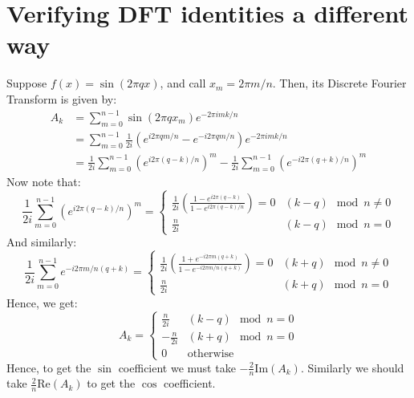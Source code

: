 \documentclass[reqno]{article}
\begin{document}
\section{Verifying DFT identities a different way}
Suppose $f(x) = \sin(2\pi q x)$, and call $x_m = 2\pi m / n$.
Then, its Discrete Fourier Transform is given by:
\begin{equation}
    \begin{split}
        A_k
        &=
        \sum_{m = 0}^{n - 1}
        \sin(2\pi q x_m)
        e^{-2\pi i mk / n} \\
        &=
        \sum_{m = 0}^{n - 1}
        \frac{1}{2i} \left( e^{i 2\pi q m / n} - e^{-i 2\pi q m / n} \right)
        e^{-2\pi i mk / n} \\
        &=
        \frac{1}{2i} \sum_{m = 0}^{n - 1}
        \left( e^{i 2\pi (q - k)/n} \right)^m
        -
        \frac{1}{2i} \sum_{m = 0}^{n - 1}
        \left( e^{-i 2\pi (q + k)/ n} \right)^m
    \end{split}
\end{equation}
Now note that:
\begin{equation}
    \frac{1}{2i} \sum_{m = 0}^{n - 1}
    \left( e^{i 2\pi (q - k)/ n}\right)^m
    =
    \begin{cases}
        \frac{1}{2i} \left(\frac{1 - e^{i 2\pi (q - k)}}{1 - e^{i 2\pi (q - k) / n}}\right)
        = 0
        &(k - q) \mod n \neq 0 \\
        \frac{n}{2 i}
        &(k - q) \mod n = 0
    \end{cases}
\end{equation}
And similarly:
\begin{equation}
    \frac{1}{2i} \sum_{m = 0}^{n - 1}
    e^{-i 2\pi m / n (q + k)}
    =
    \begin{cases}
        \frac{1}{2i} \left(\frac{1 + e^{-i 2\pi m (q + k)}}{1 - e^{-i 2\pi m/n (q + k)}}\right)
        = 0
        &(k + q) \mod n \neq 0 \\
        \frac{n}{2 i}
        &(k + q) \mod n = 0
    \end{cases}
\end{equation}
Hence, we get:
\begin{equation}
    A_k
    =
    \begin{cases}
        \frac{n}{2 i} &(k - q) \mod n = 0 \\
        -\frac{n}{2 i} &(k + q) \mod n = 0 \\
        0 &\text{otherwise}
    \end{cases}
\end{equation}
Hence, to get the $\sin$ coefficient we must take $-\frac{2}{n}\text{Im}(A_k)$.
Similarly we should take $\frac{2}{n} \text{Re}(A_k)$ to get the $\cos$ coefficient.
\end{document}

